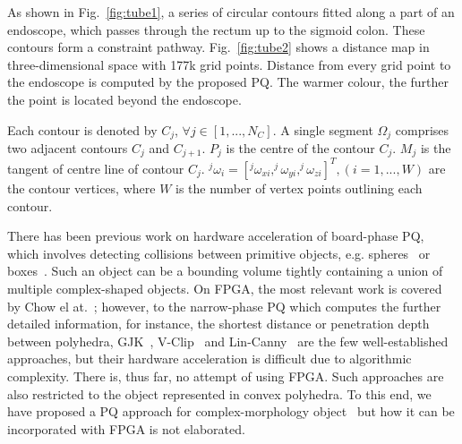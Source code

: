 As shown in Fig.~\ref{fig:tube1}, a series of circular contours fitted along a part of an endoscope, which passes through the rectum up to the sigmoid colon. 
These contours form a constraint pathway. 
Fig.~\ref{fig:tube2} shows a distance map in three-dimensional space with 177k grid points. 
Distance from every grid point to the endoscope is computed by the proposed PQ. 
The warmer colour, the further the point is located beyond the endoscope.

\begin{mydef}
Each contour is denoted by $C_j$, $\forall j \in [1,...,N_C]$.
A single segment $\Omega_j$ comprises two adjacent contours $C_j$ and $C_{j+1}$.
$P_j$ is the centre of the contour $C_j$.
$M_j$ is the tangent of centre line of contour $C_j$.
$^j\omega_i=[^j\omega_{xi},^j\omega_{yi},^j\omega_{zi}]^T, (i=1,...,W)$ are the contour vertices,
where $W$ is the number of vertex points outlining each contour.
\end{mydef}

There has been previous work on hardware acceleration of board-phase PQ, which involves detecting collisions between primitive objects, e.g. spheres~\cite{benallegue09} or boxes~\cite{zhang07}. 
Such an object can be a bounding volume tightly containing a union of multiple complex-shaped objects. 
On FPGA, the most relevant work is covered by Chow el at.~\cite{chow11}; 
however, to the narrow-phase PQ which computes the further detailed information, for instance, 
the shortest distance or penetration depth between polyhedra, GJK~\cite{gilbert88}, V-Clip~\cite{mirtich98} and Lin-Canny~\cite{lin91} are the few well-established approaches, 
but their hardware acceleration is difficult due to algorithmic complexity. 
There is, thus far, no attempt of using FPGA. 
Such approaches are also restricted to the object represented in convex polyhedra. 
To this end, we have proposed a PQ approach for complex-morphology object~\cite{kwok13} but how it can be incorporated with FPGA is not elaborated.

